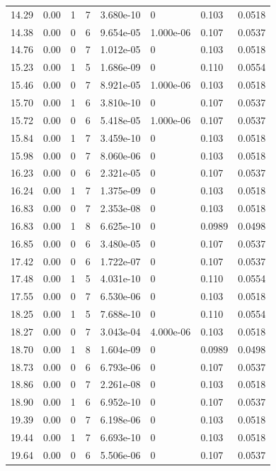 \documentclass[preview]{standalone}
\begin{document}
{{{\begin{tabular}{L{1.2cm}C{1.2cm} C{0.3cm}C{0.5cm} C{1.4cm}C{1.4cm} C{1.4cm}C{1.4cm}}
  14.29  &  0.00  & 1     &  7 &  3.680e-10  & 0  & 0.103 &  0.0518   \\ 
  14.38  &  0.00  & 0     &  6 &  9.654e-05  & 1.000e-06  & 0.107 &  0.0537   \\ 
  14.76  &  0.00  & 0     &  7 &  1.012e-05  & 0  & 0.103 &  0.0518   \\ 
  15.23  &  0.00  & 1     &  5 &  1.686e-09  & 0  & 0.110 &  0.0554   \\ 
  15.46  &  0.00  & 0     &  7 &  8.921e-05  & 1.000e-06  & 0.103 &  0.0518   \\ 
  15.70  &  0.00  & 1     &  6 &  3.810e-10  & 0  & 0.107 &  0.0537   \\ 
  15.72  &  0.00  & 0     &  6 &  5.418e-05  & 1.000e-06  & 0.107 &  0.0537   \\ 
  15.84  &  0.00  & 1     &  7 &  3.459e-10  & 0  & 0.103 &  0.0518   \\ 
  15.98  &  0.00  & 0     &  7 &  8.060e-06  & 0  & 0.103 &  0.0518   \\ 
  16.23  &  0.00  & 0     &  6 &  2.321e-05  & 0  & 0.107 &  0.0537   \\ 
  16.24  &  0.00  & 1     &  7 &  1.375e-09  & 0  & 0.103 &  0.0518   \\ 
  16.83  &  0.00  & 0     &  7 &  2.353e-08  & 0  & 0.103 &  0.0518   \\ 
  16.83  &  0.00  & 1     &  8 &  6.625e-10  & 0  & 0.0989 &  0.0498   \\ 
  16.85  &  0.00  & 0     &  6 &  3.480e-05  & 0  & 0.107 &  0.0537   \\ 
  17.42  &  0.00  & 0     &  6 &  1.722e-07  & 0  & 0.107 &  0.0537   \\ 
  17.48  &  0.00  & 1     &  5 &  4.031e-10  & 0  & 0.110 &  0.0554   \\ 
  17.55  &  0.00  & 0     &  7 &  6.530e-06  & 0  & 0.103 &  0.0518   \\ 
  18.25  &  0.00  & 1     &  5 &  7.688e-10  & 0  & 0.110 &  0.0554   \\ 
  18.27  &  0.00  & 0     &  7 &  3.043e-04  & 4.000e-06  & 0.103 &  0.0518   \\ 
  18.70  &  0.00  & 1     &  8 &  1.604e-09  & 0  & 0.0989 &  0.0498   \\ 
  18.73  &  0.00  & 0     &  6 &  6.793e-06  & 0  & 0.107 &  0.0537   \\ 
  18.86  &  0.00  & 0     &  7 &  2.261e-08  & 0  & 0.103 &  0.0518   \\ 
  18.90  &  0.00  & 1     &  6 &  6.952e-10  & 0  & 0.107 &  0.0537   \\ 
  19.39  &  0.00  & 0     &  7 &  6.198e-06  & 0  & 0.103 &  0.0518   \\ 
  19.44  &  0.00  & 1     &  7 &  6.693e-10  & 0  & 0.103 &  0.0518   \\ 
  19.64  &  0.00  & 0     &  6 &  5.506e-06  & 0  & 0.107 &  0.0537   \\ 
\hline 
\end{tabular} 

}}}
\end{document}
